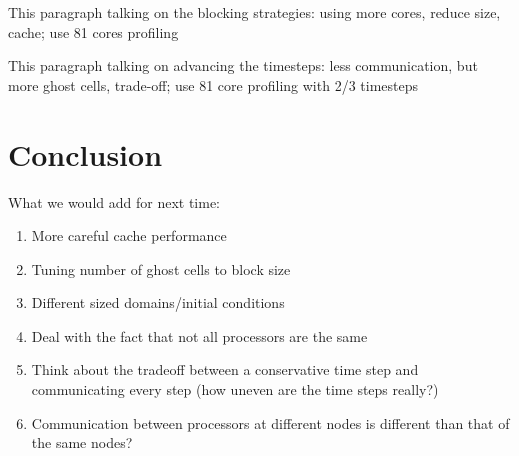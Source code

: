 \documentclass{article}
\begin{document}
This paragraph talking on the blocking strategies: using more cores, reduce size, cache; use 81 cores profiling

This paragraph talking on advancing the timesteps: less communication, but more ghost cells, trade-off; use 81 core profiling with 2/3 timesteps




\section{Conclusion}
What we would add for next time:
\begin{enumerate}
	\item More careful cache performance
	\item Tuning number of ghost cells to block size
	\item Different sized domains/initial conditions
	\item Deal with the fact that not all processors are the same
	\item Think about the tradeoff between a conservative time step and communicating every step (how uneven are the time steps really?)
	\item Communication between processors at different nodes is different than that of the same nodes?
\end{enumerate}

\appendix
\end{document}
